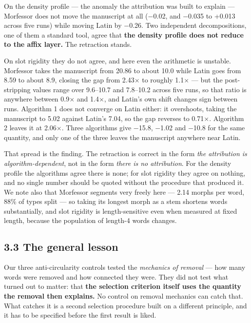 \documentclass[11pt,a4paper]{article}
\begin{document}
On the density profile --- the anomaly the attribution was built to explain --- Morfessor does not move the manuscript at all ($-$0.02, and $-$0.035 to +0.013 across five runs) while moving Latin by $-$0.26. Two independent decompositions, one of them a standard tool, agree that \textbf{the density profile does not reduce to the affix layer.} The retraction stands.


On slot rigidity they do not agree, and here even the arithmetic is unstable. Morfessor takes the manuscript from 20.86 to about 10.0 while Latin goes from 8.59 to about 8.9, closing the gap from 2.43$\times$ to roughly 1.1$\times$ --- but the post-stripping values range over 9.6--10.7 and 7.8--10.2 across five runs, so that ratio is anywhere between 0.9$\times$ and 1.4$\times$, and Latin's own shift changes sign between runs. Algorithm 1 does not converge on Latin either: it overshoots, taking the manuscript to 5.02 against Latin's 7.04, so the gap reverses to 0.71$\times$. Algorithm 2 leaves it at 2.06$\times$. Three algorithms give $-$15.8, $-$1.02 and $-$10.8 for the same quantity, and only one of the three leaves the manuscript anywhere near Latin.


That spread is the finding. The retraction is correct in the form \emph{the attribution is algorithm-dependent}, not in the form \emph{there is no attribution}. For the density profile the algorithms agree there is none; for slot rigidity they agree on nothing, and no single number should be quoted without the procedure that produced it. We note also that Morfessor segments very freely here --- 2.14 morphs per word, 88\% of types split --- so taking its longest morph as a stem shortens words substantially, and slot rigidity is length-sensitive even when measured at fixed length, because the population of length-4 words changes.


\subsection*{3.3 The general lesson}


Our three anti-circularity controls tested the \emph{mechanics of removal} --- how many words were removed and how connected they were. They did not test what turned out to matter: that \textbf{the selection criterion itself uses the quantity the removal then explains.} No control on removal mechanics can catch that. What catches it is a second selection procedure built on a different principle, and it has to be specified before the first result is liked.
\end{document}
